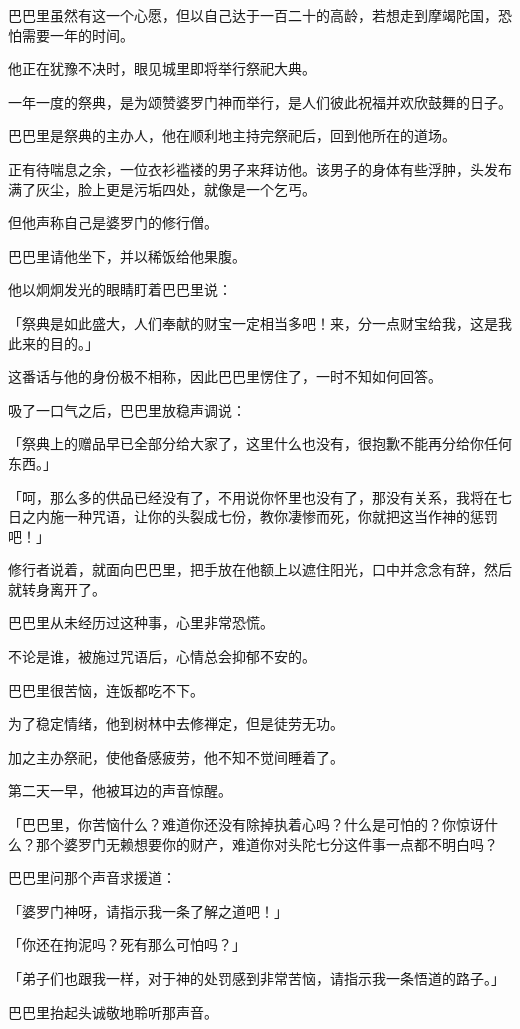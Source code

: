 \documentclass[twoside,openany]{book}
\begin{document}
巴巴里虽然有这一个心愿，但以自己达于一百二十的高龄，若想走到摩竭陀国，恐怕需要一年的时间。

他正在犹豫不决时，眼见城里即将举行祭祀大典。

一年一度的祭典，是为颂赞婆罗门神而举行，是人们彼此祝福并欢欣鼓舞的日子。

巴巴里是祭典的主办人，他在顺利地主持完祭祀后，回到他所在的道场。

正有待喘息之余，一位衣衫褴褛的男子来拜访他。该男子的身体有些浮肿，头发布满了灰尘，脸上更是污垢四处，就像是一个乞丐。

但他声称自己是婆罗门的修行僧。

巴巴里请他坐下，并以稀饭给他果腹。

他以炯炯发光的眼睛盯着巴巴里说：

「祭典是如此盛大，人们奉献的财宝一定相当多吧！来，分一点财宝给我，这是我此来的目的。」

这番话与他的身份极不相称，因此巴巴里愣住了，一时不知如何回答。

吸了一口气之后，巴巴里放稳声调说：

「祭典上的赠品早已全部分给大家了，这里什么也没有，很抱歉不能再分给你任何东西。」

「呵，那么多的供品已经没有了，不用说你怀里也没有了，那没有关系，我将在七日之内施一种咒语，让你的头裂成七份，教你凄惨而死，你就把这当作神的惩罚吧！」

修行者说着，就面向巴巴里，把手放在他额上以遮住阳光，口中并念念有辞，然后就转身离开了。

巴巴里从未经历过这种事，心里非常恐慌。

不论是谁，被施过咒语后，心情总会抑郁不安的。

巴巴里很苦恼，连饭都吃不下。

为了稳定情绪，他到树林中去修禅定，但是徒劳无功。

加之主办祭祀，使他备感疲劳，他不知不觉间睡着了。

第二天一早，他被耳边的声音惊醒。

「巴巴里，你苦恼什么？难道你还没有除掉执着心吗？什么是可怕的？你惊讶什么？那个婆罗门无赖想要你的财产，难道你对头陀七分这件事一点都不明白吗？

巴巴里问那个声音求援道：

「婆罗门神呀，请指示我一条了解之道吧！」

「你还在拘泥吗？死有那么可怕吗？」

「弟子们也跟我一样，对于神的处罚感到非常苦恼，请指示我一条悟道的路子。」

巴巴里抬起头诚敬地聆听那声音。
\end{document}
